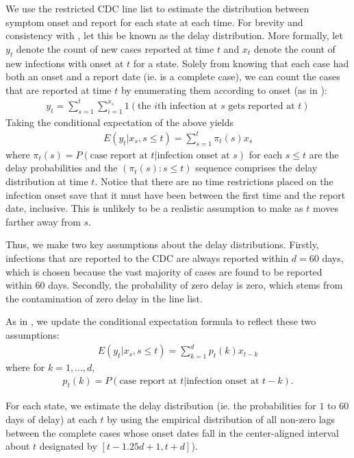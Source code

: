 \documentclass{article}
\begin{document}
We use the restricted CDC line list to estimate the distribution between symptom
onset and report for each state at each time. For brevity and consistency with
\citet{jahja2022real}, let this be known as the delay distribution. More
formally, let $y_t$ denote the count of new cases reported at time $t$ and $x_t$
denote the count of new infections with onset at $t$ for a state. Solely from
knowing that each case had both an onset and a report date (ie. is a complete
case), we can count the cases that are reported at time $t$ by enumerating
them according to onset (as in \citet{jahja2022real}):
\begin{align*}
y_t = \sum_{s=1}^{t} \sum_{i=1}^{x_s}1 \left ( \text{the }i\text{th infection at }
 s \text{ gets reported at }t \right )
\end{align*}
Taking the conditional expectation of the above yields
\begin{align*}
E(y_t | x_s, s \leq t) = \sum_{s=1}^{t} \pi_t(s) x_s 
\end{align*}
where $\pi_t(s) = P(\text{case report at }t| \text{infection onset at }s)$ for
each $s \leq t$ are the delay probabilities and the $\left( \pi_t(s) : s \leq t
\right)$ sequence comprises the delay distribution at time $t$. Notice that
there are no time restrictions placed on the infection onset save that it must
have been between the first time and the report date, inclusive. This is
unlikely to be a realistic assumption to make as $t$ moves farther away from
$s$. 

Thus, we make two key assumptions about the delay distributions. Firstly,
infections that are reported to the CDC are always reported within $d = 60$
days, which is chosen because the vast majority of cases are found to be
reported within $60$ days. Secondly, the probability of zero delay is zero,
which stems from the contamination of zero delay in the line list. 

As in \citet{jahja2022real}, we update the conditional expectation formula to
reflect these two assumptions: 
\begin{align*}
E(y_t | x_s, s \leq t) = \sum_{k=1}^{d} p_t(k) x_{t-k}
\end{align*}
where for $k = 1, \dots, d$,
\begin{align*}
p_t(k) = P(\text{case report at }t | \text{infection onset at }t-k).
\end{align*}

For each state, we estimate the delay distribution (ie. the probabilities for
$1$ to $60$ days of delay) at each $t$ by using the empirical distribution of
all non-zero lags between the complete cases whose onset dates fall in the
center-aligned interval about $t$ designated by $\left[ t - 1.25d + 1, t + d
\right]$). 
\end{document}
